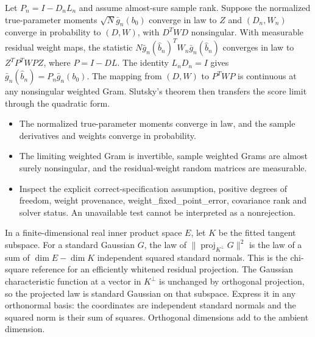 \expandafter\def\csname statadic@statement@STATADIC-JTEST-001\endcsname{Let $P_n=I-D_n L_n$ and assume almost-sure sample rank.
  Suppose the normalized true-parameter moments $\sqrt{N}\bar g_n(b_0)$
  converge in law to $Z$ and $(D_n,W_n)$ converge in probability to $(D,W)$,
  with $D^TWD$ nonsingular. With measurable residual weight maps, the
  statistic $N\bar g_n(\hat b_n)^TW_n\bar g_n(\hat b_n)$ converges in law
  to $Z^T P^T W P Z$, where $P=I-DL$.}
\expandafter\def\csname statadic@proof@STATADIC-JTEST-001\endcsname{The identity $L_n D_n=I$ gives
  $\bar g_n(\hat b_n)=P_n\bar g_n(b_0)$. The mapping from
  $(D,W)$ to $P^T W P$ is continuous at any nonsingular weighted Gram.
  Slutsky's theorem then transfers the score limit through the quadratic form.}
\expandafter\def\csname statadic@assumptions@STATADIC-JTEST-001\endcsname{\begin{itemize}
\item The normalized true-parameter moments converge in law, and the sample derivatives and weights converge in probability.
\item The limiting weighted Gram is invertible, sample weighted Grams are almost surely nonsingular, and the residual-weight random matrices are measurable.
\end{itemize}}
\expandafter\def\csname statadic@diagnostics@STATADIC-JTEST-001\endcsname{\begin{itemize}
\item Inspect the explicit correct-specification assumption, positive degrees of freedom, weight provenance, weight\_fixed\_point\_error, covariance rank and solver status. An unavailable test cannot be interpreted as a nonrejection.
\end{itemize}}
\expandafter\def\csname statadic@statement@STATADIC-JTEST-002\endcsname{In a finite-dimensional real inner product space $E$, let
  $K$ be the fitted tangent subspace. For a standard Gaussian $G$, the law of
  $\|\operatorname{proj}_{K^\perp}G\|^2$ is the law of a sum of
  $\dim E-\dim K$ independent squared standard normals. This is the
  chi-square reference for an efficiently whitened residual projection.}
\expandafter\def\csname statadic@proof@STATADIC-JTEST-002\endcsname{The Gaussian characteristic function at a vector in
  $K^\perp$ is unchanged by orthogonal projection, so the projected law is
  standard Gaussian on that subspace. Express it in any orthonormal basis:
  the coordinates are independent standard normals and the squared norm is
  their sum of squares. Orthogonal dimensions add to the ambient dimension.}
